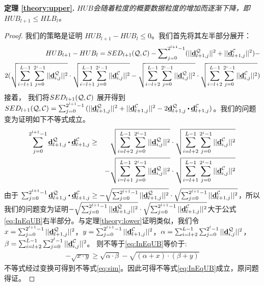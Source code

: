 \textbf{定理 \ref{theory:upper}. }{\em $HUB$会随着粒度的概要数据粒度的增加而逐渐下降，即$HUB_{l+1} \le HLB_{l}$。}
\begin{proof}
	我们的策略是证明 $HUB_{l+1}- HUB_{l}\le 0$。我们首先将其左半部分展开：
	\begin{eqnarray}\label{eq:minusupper}
	HUB_{l+1}- HUB_{l}= SED_{l+1}({\cal Q},{\cal C}) - \sum\nolimits_{j=0}^{2^{l+1}-1}(||\emph{{\textbf{d}}}_{l+1,j}^{\cal Q}||^2  + ||\emph{{\textbf{d}}}_{l+1,j}^{\cal C}||^2) -\nonumber\\
	2(\sqrt{\sum_{i=l+1}^{L -1}\sum_{j=0}^{2^i-1}||\emph{{\textbf{d}}}_{i,j}^{\cal Q}||^2} \cdot \sqrt{\sum_{i=l+1}^{L -1}\sum_{j=0}^{2^i-1}||\emph{{\textbf{d}}}_{i,j}^{\cal C}||^2} -\sqrt{\sum_{i=l+2}^{L -1}\sum_{j=0}^{2^i-1}||\emph{{\textbf{d}}}_{i,j}^{\cal Q}||^2} \cdot \sqrt{\sum_{i=l+2}^{L -1}\sum_{j=0}^{2^i-1}||\emph{{\textbf{d}}}_{i,j}^{\cal C}||^2})\nonumber
	\end{eqnarray}	
		接着， 我们将$SED_{l+1}({\cal Q},{\cal C})$ 展开得到$SED_{l+1}({\cal Q},{\cal C})=\sum_{j=0}^{2^{l+1}-1}{(||\vd_{l+1,j}^{\cal Q}||^2+||\vd_{l+1,j}^{\cal C}||^2}-2 \vd_{l+1,j}^{\cal Q} \bigcdot \vd_{l+1,j}^{\cal C})$。我们的问题变为证明如下不等式成立。
	\begin{eqnarray}\label{eq:InEqUB}
	\sum_{j=0}^{2^{l+1}-1}\vd_{l+1,j}^{\cal Q} \bigcdot \vd_{l+1,j}^{\cal C} &\ge&
	\sqrt{\sum_{i=l+2}^{L-1}\sum_{j=0}^{2^i-1}||\vd_{i,j}^{\cal Q}||^2} \cdot \sqrt{\sum_{i=l+2}^{L-1}\sum_{j=0}^{2^i-1}||\vd_{i,j}^{\cal C}||^2} \nonumber\\
	&\quad&	-		 \sqrt{\sum_{i=l+1}^{L-1}\sum_{j=0}^{2^i-1}||\vd_{i,j}^{\cal Q}||^2} \cdot \sqrt{\sum_{i=l+1}^{L-1}\sum_{j=0}^{2^i-1}||\vd_{i,j}^{\cal C}||^2} 
	\end{eqnarray}	
	由于	$\sum_{j=0}^{2^{l+1}-1}\vd_{l+1,j}^{\cal Q}\bigcdot \vd_{l+1,j}^{\cal C} \ge
-	\sqrt{\sum_{j=0}^{2^{l+1}-1}||\vd_{l+1,j}^{\cal Q}||^2} \cdot \sqrt{\sum_{j=0}^{2^{l+1}-1}||\vd_{l+1,j}^{\cal C}||^2}$，所以我们的问题变为证明$-\sqrt{\sum_{j=0}^{2^{l+1}-1}||\emph{{\textbf{d}}}_{l+1,j}^{\cal Q}||^2} \cdot \sqrt{\sum_{j=0}^{2^{l+1}-1}||\emph{{\textbf{d}}}_{l+1,j}^{\cal C}||^2} $大于公式\ref{eq:InEqUB}右半部分。与定理\ref{theory:lower}证明类似，我们令$x= \sum_{j=0}^{2^{l+1}-1}||\emph{{\textbf{d}}}_{l+1,j}^{\cal Q}||^2$，$y=\sum_{j=0}^{2^{l+1}-1}||\emph{{\textbf{d}}}_{l+1,j}^{\cal C}||^2$，$\alpha = \sum_{i=l+2}^{L-1}\sum_{j=0}^{2^l-1}||\emph{{\textbf{d}}}_{i,j}^{\cal Q}||^2$，$\beta =  \sum_{i=l+2}^{L-1}\sum_{j=0}^{2^l-1}||\emph{{\textbf{d}}}_{i,j}^{\cal C}||^2$。
	则不等于\ref{eq:InEqUB}等价于:
	\begin{eqnarray}\label{eq:simUB}
	- \sqrt{x \cdot y} \ge  \sqrt{\alpha \cdot \beta}  -  \sqrt{(\alpha+x) \cdot (\beta+y)} 
	\end{eqnarray}	
	不等式经过变换可得到不等式\ref{eq:sim}。因此可得不等式\ref{eq:InEqUB}成立，原问题得证。
\end{proof}


\clearpage
\phantom{s}
\clearpage